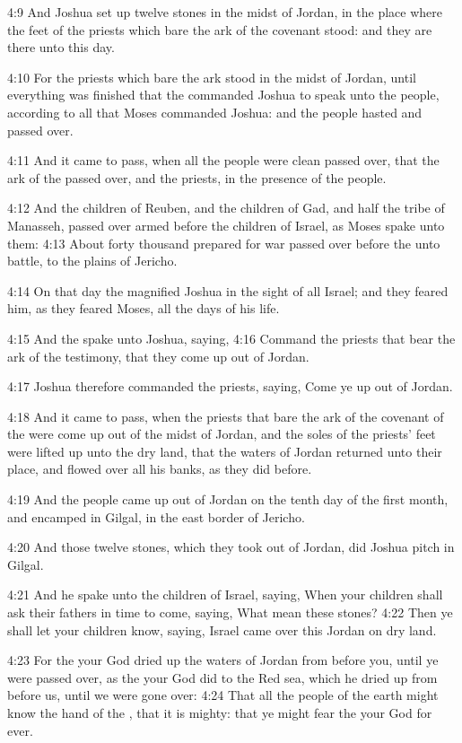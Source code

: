 4:9 And Joshua set up twelve stones in the midst of Jordan, in the place where the feet of the priests which bare the ark of the covenant stood: and they are there unto this day.

4:10 For the priests which bare the ark stood in the midst of Jordan, until everything was finished that the \LORD commanded Joshua to speak unto the people, according to all that Moses commanded Joshua: and the people hasted and passed over.

4:11 And it came to pass, when all the people were clean passed over, that the ark of the \LORD passed over, and the priests, in the presence of the people.

4:12 And the children of Reuben, and the children of Gad, and half the tribe of Manasseh, passed over armed before the children of Israel, as Moses spake unto them: 4:13 About forty thousand prepared for war passed over before the \LORD unto battle, to the plains of Jericho.

4:14 On that day the \LORD magnified Joshua in the sight of all Israel; and they feared him, as they feared Moses, all the days of his life.

4:15 And the \LORD spake unto Joshua, saying, 4:16 Command the priests that bear the ark of the testimony, that they come up out of Jordan.

4:17 Joshua therefore commanded the priests, saying, Come ye up out of Jordan.

4:18 And it came to pass, when the priests that bare the ark of the covenant of the \LORD were come up out of the midst of Jordan, and the soles of the priests' feet were lifted up unto the dry land, that the waters of Jordan returned unto their place, and flowed over all his banks, as they did before.

4:19 And the people came up out of Jordan on the tenth day of the first month, and encamped in Gilgal, in the east border of Jericho.

4:20 And those twelve stones, which they took out of Jordan, did Joshua pitch in Gilgal.

4:21 And he spake unto the children of Israel, saying, When your children shall ask their fathers in time to come, saying, What mean these stones?  4:22 Then ye shall let your children know, saying, Israel came over this Jordan on dry land.

4:23 For the \LORD your God dried up the waters of Jordan from before you, until ye were passed over, as the \LORD your God did to the Red sea, which he dried up from before us, until we were gone over: 4:24 That all the people of the earth might know the hand of the \LORD, that it is mighty: that ye might fear the \LORD your God for ever.

